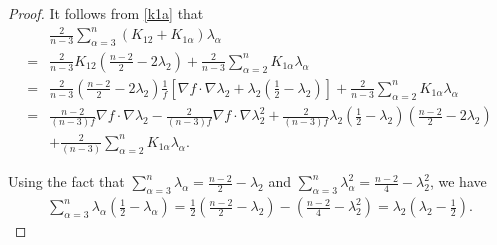 \documentclass[12pt]{amsart}
\begin{document}
\begin{proof}
It follows from \eqref{k1a} that
\begin{equation*}
	\begin{aligned}
		&\frac{2}{n-3}\sum_{\alpha=3}^n(K_{12}+K_{1\alpha })\lambda_\alpha\\
		=& \frac{2}{n-3}K_{12}({\frac{n-2}{2}}-2\lambda_{2})+\frac{2}{n-3}\sum_{\alpha=2}^nK_{1\alpha}\lambda_\alpha\\
		=&\frac{2}{n-3}({\frac{n-2}{2}}-2\lambda_{2})\frac{1}{f}\left[\nabla f\cdot \nabla \lambda_2 +\lambda_2(\frac{1}{2}-\lambda_2) \right]+\frac{2}{n-3}\sum_{\alpha=2}^nK_{1\alpha}\lambda_\alpha\\
		=&\frac{n-2}{(n-3)f}\nabla f\cdot \nabla \lambda_2-\frac{2}{(n-3)f}\nabla f\cdot \nabla \lambda_2^2
		+\frac{2}{(n-3)f}\lambda_2(\frac{1}{2}-\lambda_2)({\frac{n-2}{2}}-2\lambda_{2})\\
		&+\frac{2}{(n-3)}\sum_{\alpha=2}^nK_{1\alpha}\lambda_\alpha.
	\end{aligned}
\end{equation*}

Using the fact that $\sum_{\alpha=3}^n\lambda_\alpha=\frac{n-2}{2}-\lambda_2$ and $\sum_{\alpha=3}^n\lambda_\alpha^2=\frac{n-2}{4}-\lambda_2^2$,
we have
\begin{align*}
\sum_{\alpha=3}^n \lambda_\alpha(\frac{1}{2}-\lambda_\alpha)=\frac{1}{2}(\frac{n-2}{2}-\lambda_2)-(\frac{n-2}{4}-\lambda_2^2)=\lambda_2(\lambda_2-\frac{1}{2}).
\end{align*}


\end{proof}
\end{document}
